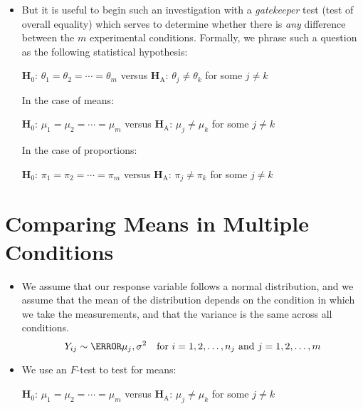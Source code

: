 \begin{itemize}
      \item But it is useful to begin such an investigation with a \emph{gatekeeper}
            test (test of overall equality) which serves to determine whether
            there is \emph{any} difference between the $ m $ experimental conditions.
            Formally, we phrase such a question as the following statistical hypothesis:
            \begin{tightcenter}
                  $ \mathbf{H}_0 $: $ \theta_1=\theta_2=\cdots=\theta_m $ versus $ \mathbf{H}_\text{A} $: $ \theta_j\ne \theta_k $ for some $ j\ne k $
            \end{tightcenter}
            In the case of means:
            \begin{tightcenter}
                  $ \mathbf{H}_0 $: $ \mu_1=\mu_2=\cdots=\mu_m $ versus $ \mathbf{H}_\text{A} $: $ \mu_j\ne \mu_k $ for some $ j\ne k $
            \end{tightcenter}
            In the case of proportions:
            \begin{tightcenter}
                  $ \mathbf{H}_0 $: $ \pi_1=\pi_2=\cdots=\pi_m $ versus $ \mathbf{H}_\text{A} $: $ \pi_j\ne \pi_k $ for some $ j\ne k $
            \end{tightcenter}
\end{itemize}
\section{Comparing Means in Multiple Conditions}
\begin{itemize}
      \item We assume that our response variable follows a normal distribution,
            and we assume that the mean of the distribution depends on the condition
            in which we take the measurements, and that the variance
            is the same across all conditions.
            \[ Y_{ij}\sim \N{\mu_j,\sigma^2}\quad\text{for }i=1,2,\ldots,n_j\text{ and }j=1,2,\ldots,m \]
      \item We use an $ F $-test to test for means:
            \begin{tightcenter}
                  $ \mathbf{H}_0 $: $ \mu_1=\mu_2=\cdots=\mu_m $ versus $\mathbf{H}_\text{A}$: $ \mu_j\ne \mu_k $ for some $ j\ne k $
            \end{tightcenter}
\end{itemize}
